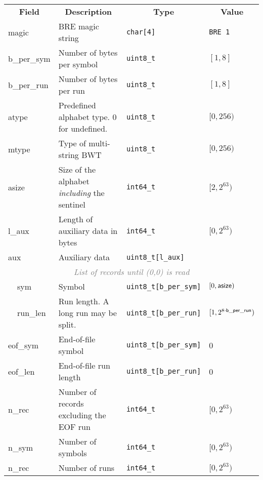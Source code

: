 \documentclass[10pt]{article}
\begin{document}
\begin{table}[ht]
\centering
{\small
\begin{tabular}{|l|l|p{7cm}|l|l|}
  \cline{1-5}
  \multicolumn{2}{|c|}{\bf Field} & \multicolumn{1}{c|}{\bf Description} & \multicolumn{1}{c|}{\bf Type} & \multicolumn{1}{c|}{\bf Value} \\\cline{1-5}
  \multicolumn{2}{|l|}{\sf magic} & BRE magic string & {\tt char[4]} & {\tt BRE\char92 1}\\\cline{1-5}
  \multicolumn{2}{|l|}{\sf b\_per\_sym} & Number of bytes per symbol & {\tt uint8\_t} & $[1,8]$ \\\cline{1-5}
  \multicolumn{2}{|l|}{\sf b\_per\_run} & Number of bytes per run & {\tt uint8\_t} & $[1,8]$ \\\cline{1-5}
  \multicolumn{2}{|l|}{\sf atype} & Predefined alphabet type. 0 for undefined. & {\tt uint8\_t} & $[0,256)$ \\\cline{1-5}
  \multicolumn{2}{|l|}{\sf mtype} & Type of multi-string BWT & {\tt uint8\_t} & $[0,256)$ \\\cline{1-5}
  \multicolumn{2}{|l|}{\sf asize} & Size of the alphabet \emph{including} the sentinel & {\tt int64\_t} & $[2,2^{63})$ \\\cline{1-5}
  \multicolumn{2}{|l|}{\sf l\_aux} & Length of auxiliary data in bytes & {\tt int64\_t} & $[0,2^{63})$ \\\cline{1-5}
  \multicolumn{2}{|l|}{\sf aux} & Auxiliary data & {\tt uint8\_t[l\_aux]} & \\\cline{1-5}
  \multicolumn{5}{|c|}{\textcolor{gray}{\it List of records until (0,0) is read}} \\\cline{2-5}
  & {\sf sym} & Symbol & {\tt uint8\_t[b\_per\_sym]} & $[0,{\sf asize})$ \\\cline{2-5}
  & {\sf run\_len} & Run length. A long run may be split. & {\tt uint8\_t[b\_per\_run]} & $[1,2^{8\cdot{\sf b\_per\_run}})$ \\\cline{1-5}
  \multicolumn{2}{|l|}{\sf eof\_sym} & End-of-file symbol & {\tt uint8\_t[b\_per\_sym]} & 0 \\\cline{1-5}
  \multicolumn{2}{|l|}{\sf eof\_len} & End-of-file run length & {\tt uint8\_t[b\_per\_run]} & 0 \\\cline{1-5}
  \multicolumn{2}{|l|}{\sf n\_rec} & Number of records excluding the EOF run & {\tt int64\_t} & $[0,2^{63})$ \\\cline{1-5}
  \multicolumn{2}{|l|}{\sf n\_sym} & Number of symbols & {\tt int64\_t} & $[0,2^{63})$ \\\cline{1-5}
  \multicolumn{2}{|l|}{\sf n\_rec} & Number of runs & {\tt int64\_t} & $[0,2^{63})$ \\\cline{1-5}
\end{tabular}}
\end{table}
\end{document}
